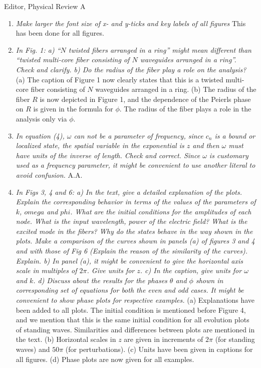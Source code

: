 \documentclass[11pt]{letter}
\begin{document}
\begin{letter}{Editor, Physical Review A}
\begin{enumerate}
\item \emph{Make larger the font size of x- and y-ticks and key labels of all figures} This has been done for all figures.

\item \emph{In Fig. 1: a) ``$N$ twisted fibers arranged in a ring'' might mean different than ``twisted multi-core fiber consisting of $N$ waveguides arranged in a ring''. Check and clarify. b) Do the radius of the fiber play a role on the analysis?} (a) The caption of Figure 1 now clearly states that this is a twisted multi-core fiber consisting of $N$ waveguides arranged in a ring. (b) The radius of the fiber $R$ is now depicted in Figure 1, and the dependence of the Peierls phase on $R$ is given in the formula for $\phi$. The radius of the fiber plays a role in the analysis only via $\phi$.

\item \emph{In equation (4), $\omega$ can not be a parameter of frequency, since $c_n$ is a bound or localized state, the spatial variable in the exponential is $z$ and then $\omega$ must have units of the inverse of length. Check and correct. Since $\omega$ is customary used as a frequency parameter, it might be convenient to use another literal to avoid confusion.} A.A.

\item \emph{In Figs 3, 4 and 6: a) In the text, give a detailed explanation of the plots. Explain the corresponding behavior in terms of the values of the parameters of $k$, $omega$ and $phi$. What are the initial conditions for the amplitudes of each node. What is the input wavelength, power of the electric field? What is the excited mode in the fibers? Why do the states behave in the way shown in the plots.  Make a comparison of the curves shown in panels (a) of figures 3 and 4 and with those of Fig 6 (Explain the reason of the similarity of the curves). Explain. b) In panel (a), it might be convenient to give the horizontal axis scale in multiples of $2\pi$. Give units for $z$. c) In the caption, give units for $\omega$ and $k$. d) Discuss about the results for the phases $\theta$ and $\phi$ shown in corresponding set of equations for both the even and odd cases. It might be convenient to show phase plots for respective examples.} (a) Explanations have been added to all plots. The initial condition is mentioned before Figure 4, and we mention that this is the same initial condition for all evolution plots of standing waves. Similarities and differences between plots are mentioned in the text. (b) Horizontal scales in $z$ are given in increments of $2 \pi$ (for standing waves) and $50 \pi$ (for perturbations). (c) Units have been given in captions for all figures. (d) Phase plots are now given for all examples.


\end{enumerate}
\end{letter}
\end{document}
